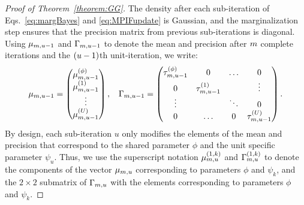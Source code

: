 \begin{proof}[Proof of Theorem~\ref{theorem:GG}]
The density after each sub-iteration of Eqs.~\ref{eq:margBayes} and \ref{eq:MPIFupdate} is Gaussian, and the marginalization step ensures that the precision matrix from previous sub-iterations is diagonal. 
Using $\mu_{m, u-1}$ and $\Gamma_{m, u-1}$ to denote the mean and precision after $m$ complete iterations and the $(u-1)$th unit-iteration, we write: 
\begin{align*}
    \mu_{m, u - 1} = \begin{pmatrix}
        \mu_{m, u-1}^{(\phi)} \\ 
        \mu_{m, u-1}^{(1)} \\ 
        \vdots \\
        \mu_{m, u-1}^{(U)}
    \end{pmatrix}, \, \, \hspace{2mm} \Gamma_{m, u-1} = \begin{pmatrix}
        \tau^{(\phi)}_{m, u-1} & 0 & \ldots & 0 \\
        0 & \tau^{(1)}_{m, u-1} & & \vdots \\ 
        \vdots & & \ddots & 0\\
        0 & \ldots & 0 & \tau^{(U)}_{m, u-1}
    \end{pmatrix}.
\end{align*}
By design, each sub-iteration $u$ only modifies the elements of the mean and precision that correspond to the shared parameter $\phi$ and the unit specific parameter $\psi_u$. Thus, we use the superscript notation $\mu_{m, u}^{(1, k)}$ and $\Gamma_{m, u}^{(1, k)}$ to denote the components of the vector $\mu_{m, u}$ corresponding to parameters $\phi$ and $\psi_k$, and the $2\times 2$ submatrix of $\Gamma_{m, u}$ with the elements corresponding to parameters $\phi$ and $\psi_k$. 


\end{proof}

